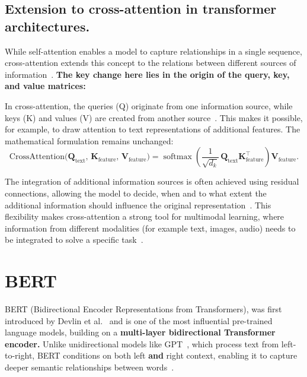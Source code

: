 
\subsection{Extension to cross-attention in transformer architectures.}
While self-attention enables a model to capture relationships in a single sequence, cross-attention extends this concept to the relations between different sources of information~\cite{vaswani2017attention}. \textbf{The key change here lies in the origin of the query, key, and value matrices:}

 In cross-attention, the queries (Q) originate from one information source, while keys (K) and values (V) are created from another source~\cite{vaswani2017attention}. This makes it possible, for example, to draw attention to text representations of additional features. The mathematical formulation remains unchanged:
\[
\mathrm{CrossAttention}\bigl(\mathbf{Q}_{\text{text}},\, \mathbf{K}_{\text{feature}},\, \mathbf{V}_{\text{feature}}\bigr)
= \operatorname{softmax}\!\left(\frac{1}{\sqrt{d_k}}\, \mathbf{Q}_{\text{text}} \mathbf{K}_{\text{feature}}^{\top}\right) \mathbf{V}_{\text{feature}}.
\]

The integration of additional information sources is often achieved using residual connections, allowing the model to decide, when and to what extent the additional information should influence the original representation~\cite{cai2025multimodal}. This flexibility makes cross-attention a strong tool for multimodal learning, where information from different modalities (for example text, images, audio) needs to be integrated to solve a specific task~\cite{li2024multimodal}. 


\section{BERT}

BERT (Bidirectional Encoder Representations from Transformers), was first introduced by Devlin et al.~\cite{devlin2019bert} and is one of the most influential pre-trained language models, building on a \textbf{multi-layer bidirectional Transformer encoder.} Unlike unidirectional models like GPT~\cite{radford2018gpt}, which process text from left-to-right, BERT conditions on both left \textbf{and} right context, enabling it to capture deeper semantic relationships between words~\cite{rogers2020primerbertologyknowbert}.

